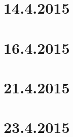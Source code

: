\documentclass[a4paper,12pt]{scrartcl}
\begin{document}
\section*{14.4.2015}

\section*{16.4.2015}

\section*{21.4.2015}

\section*{23.4.2015}

\end{document}
